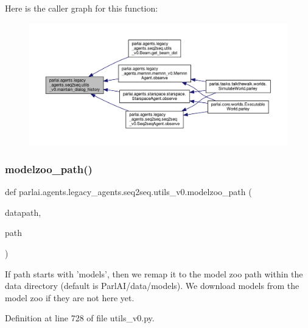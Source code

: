 Here is the caller graph for this function\+:
\nopagebreak
\begin{figure}[H]
\begin{center}
\leavevmode
\includegraphics[width=350pt]{namespaceparlai_1_1agents_1_1legacy__agents_1_1seq2seq_1_1utils__v0_ac7cb3ffae208474d6e67f37ecfe07f64_icgraph}
\end{center}
\end{figure}
\mbox{\label{namespaceparlai_1_1agents_1_1legacy__agents_1_1seq2seq_1_1utils__v0_a5fbd3301b67f00d6d146fb01c7cd7626}} 
\subsubsection{\texorpdfstring{modelzoo\+\_\+path()}{modelzoo\_path()}}
{\footnotesize\ttfamily def parlai.\+agents.\+legacy\+\_\+agents.\+seq2seq.\+utils\+\_\+v0.\+modelzoo\+\_\+path (\begin{DoxyParamCaption}\item[{}]{datapath,  }\item[{}]{path }\end{DoxyParamCaption})}

\begin{DoxyVerb}If path starts with 'models', then we remap it to the model zoo path
within the data directory (default is ParlAI/data/models).
We download models from the model zoo if they are not here yet.\end{DoxyVerb}
 

Definition at line 728 of file utils\+\_\+v0.\+py.



